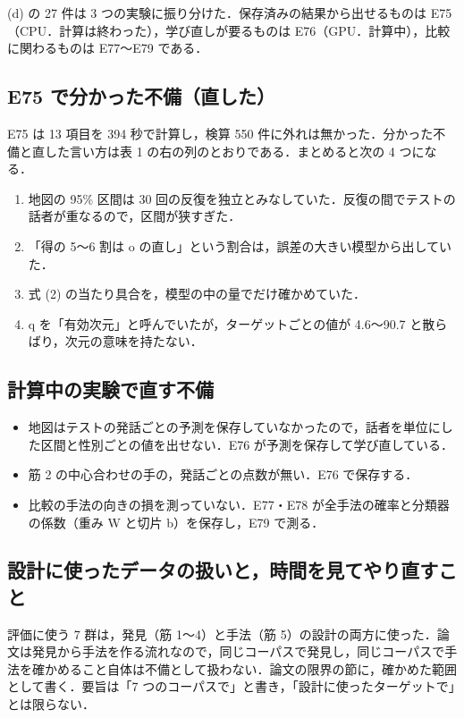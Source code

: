 \documentclass[a4paper,11pt]{ltjsarticle}
\begin{document}
(d) の 27 件は 3 つの実験に振り分けた．保存済みの結果から出せるものは E75（CPU．計算は終わった），学び直しが要るものは E76（GPU．計算中），比較に関わるものは E77〜E79 である．

\subsection{E75 で分かった不備（直した）}

E75 は 13 項目を 394 秒で計算し，検算 550 件に外れは無かった．分かった不備と直した言い方は表 1 の右の列のとおりである．まとめると次の 4 つになる．

\begin{enumerate}
\item 地図の 95\% 区間は 30 回の反復を独立とみなしていた．反復の間でテストの話者が重なるので，区間が狭すぎた．
\item 「得の 5〜6 割は o の直し」という割合は，誤差の大きい模型から出していた．
\item 式 (2) の当たり具合を，模型の中の量でだけ確かめていた．
\item q を「有効次元」と呼んでいたが，ターゲットごとの値が 4.6〜90.7 と散らばり，次元の意味を持たない．
\end{enumerate}

\subsection{計算中の実験で直す不備}

\begin{itemize}
\item 地図はテストの発話ごとの予測を保存していなかったので，話者を単位にした区間と性別ごとの値を出せない．E76 が予測を保存して学び直している．
\item 筋 2 の中心合わせの手の，発話ごとの点数が無い．E76 で保存する．
\item 比較の手法の向きの損を測っていない．E77・E78 が全手法の確率と分類器の係数（重み W と切片 b）を保存し，E79 で測る．
\end{itemize}

\subsection{設計に使ったデータの扱いと，時間を見てやり直すこと}\label{sec:redo}

評価に使う 7 群は，発見（筋 1〜4）と手法（筋 5）の設計の両方に使った．論文は発見から手法を作る流れなので，同じコーパスで発見し，同じコーパスで手法を確かめること自体は不備として扱わない．論文の限界の節に，確かめた範囲として書く．要旨は「7 つのコーパスで」と書き，「設計に使ったターゲットで」とは限らない．
\end{document}

